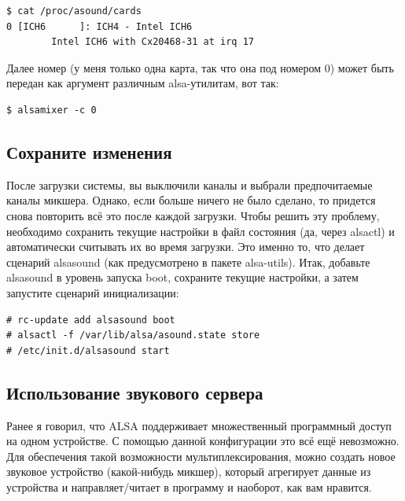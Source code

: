 \documentclass[10pt]{book}
\begin{document}
\begin{tcolorbox}
\begin{lstlisting}
$ cat /proc/asound/cards
0 [ICH6		 ]: ICH4 - Intel ICH6
		Intel ICH6 with Cx20468-31 at irq 17
\end{lstlisting}
\end{tcolorbox}

Далее номер (у меня только одна карта, так что она под номером 0) может быть передан как аргумент различным alsa-утилитам, вот так:

\begin{tcolorbox}
\begin{lstlisting}
$ alsamixer -c 0
\end{lstlisting}
\end{tcolorbox}

\subsection{Сохраните изменения}

После загрузки системы, вы выключили каналы и выбрали предпочитаемые каналы микшера. Однако, если больше ничего не было сделано, то придется снова повторить всё это после каждой загрузки. Чтобы решить эту проблему, необходимо сохранить текущие настройки в файл состояния (да, через alsactl) и автоматически считывать их во время загрузки.
Это именно то, что делает сценарий alsasound (как предусмотрено в пакете alsa-utils). Итак, добавьте alsasound в уровень запуска boot, сохраните текущие настройки, а затем запустите сценарий инициализации:

\begin{tcolorbox}
\begin{lstlisting}
# rc-update add alsasound boot
# alsactl -f /var/lib/alsa/asound.state store
# /etc/init.d/alsasound start
\end{lstlisting}
\end{tcolorbox}

\subsection{Использование звукового сервера}

Ранее я говорил, что ALSA поддерживает множественный программный доступ на одном устройстве. С помощью данной конфигурации это всё ещё невозможно. Для обеспечения такой возможности мультиплексирования, можно создать новое звуковое устройство (какой-нибудь микшер), который агрегирует данные из устройства и направляет/читает в программу и наоборот, как вам нравится.
\end{document}
